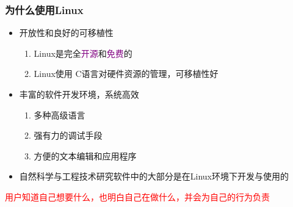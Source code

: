 \frame
{
	\frametitle{为什么使用\textrm{Linux}}
	\begin{itemize}
\setlength{\itemsep}{10pt}
		\item 开放性和良好的可移植性
			\begin{enumerate}
				\item \textrm{Linux}是完全\textcolor{purple}{开源}和\textcolor{purple}{免费}的
				\item \textrm{Linux}使用 \textrm{C}语言对硬件资源的管理，可移植性好
			\end{enumerate}
\item 丰富的软件开发环境，系统高效
	\begin{enumerate}
		\item 多种高级语言
		\item 强有力的调试手段
		\item 方便的文本编辑和应用程序
	\end{enumerate}
\item 自然科学与工程技术研究软件中的大部分是在\textrm{Linux}环境下开发与使用的
	\end{itemize}
	\textcolor{red}{用户知道自己想要什么，也明白自己在做什么，并会为自己的行为负责}
}

